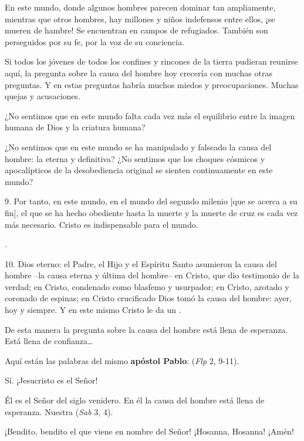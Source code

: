 \begin{body}
En este mundo, donde algunos hombres parecen dominar tan ampliamente, mientras que otros hombres, hay millones y niños indefensos entre ellos, ¡se mueren de hambre! Se encuentran en campos de refugiados. También son perseguidos por su fe, por la voz de su conciencia.

Si todos los jóvenes de todos los confines y rincones de la tierra pudieran reunirse aquí, la pregunta sobre la causa del hombre hoy crecería con muchas otras preguntas. Y en estas preguntas habría muchos miedos y preocupaciones. Muchas quejas y acusaciones.

¿No sentimos que en este mundo falta cada vez más el equilibrio entre la imagen humana de Dios y la criatura humana?

¿No sentimos que en este mundo se ha manipulado y falseado la causa del hombre: la eterna y definitiva? ¿No sentimos que los choques cósmicos y apocalípticos de la desobediencia original se sienten continuamente en este mundo?

9. Por tanto, en este mundo, en el mundo del segundo milenio [que se acerca a su fin], el que se ha hecho obediente hasta la muerte y la muerte de cruz es cada vez más necesario. Cristo es indispensable para el mundo.


.

10. Dios eterno: el Padre, el Hijo y el Espíritu Santo asumieron la causa del hombre –la causa eterna y última del hombre– en Cristo, que dio testimonio de la verdad; en Cristo, condenado como blasfemo y usurpador; en Cristo, azotado y coronado de espinas; en Cristo crucificado Dios tomó la causa del hombre: ayer, hoy y siempre. Y en este mismo Cristo le da un .

De esta manera la pregunta sobre la causa del hombre está llena de esperanza. Está llena de confianza\ldots

Aquí están las palabras del mismo \textbf{apóstol Pablo}:  (\textit{Flp} 2, 9-11).

Sí. ¡Jesucristo es el Señor!

Él es el Señor del siglo venidero. En él la causa del hombre está llena de esperanza. Nuestra  (\textit{Sab} 3, 4).

¡Bendito, bendito el que viene en nombre del Señor! ¡Hosanna, Hosanna! ¡Amén!
\end{body}

